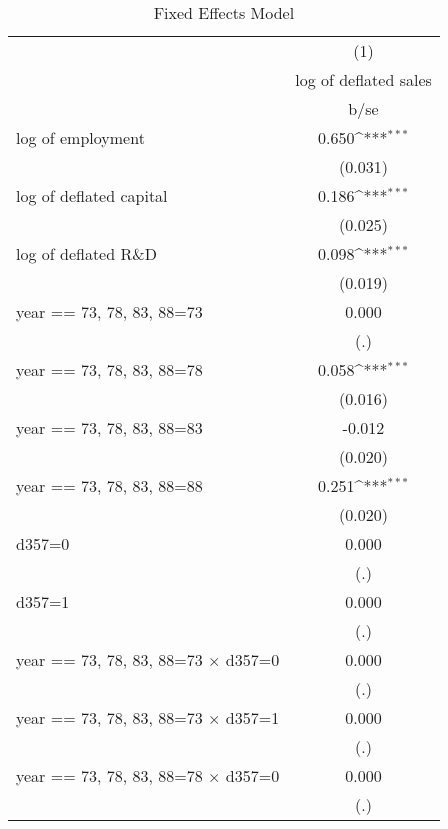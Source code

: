 \begin{table}[htbp]\centering
\def\sym#1{\ifmmode^{#1}\else\(^{#1}\)\fi}
\caption{Fixed Effects Model}
\begin{tabular}{l*{1}{c}}
\toprule
                    &\multicolumn{1}{c}{(1)}\\
                    &\multicolumn{1}{c}{log of deflated sales}\\
                    &        b/se         \\
\midrule
log of employment   &       0.650\sym{***}\\
                    &     (0.031)         \\
log of deflated capital&       0.186\sym{***}\\
                    &     (0.025)         \\
log of deflated R\&D &       0.098\sym{***}\\
                    &     (0.019)         \\
year == 73, 78, 83, 88=73&       0.000         \\
                    &         (.)         \\
year == 73, 78, 83, 88=78&       0.058\sym{***}\\
                    &     (0.016)         \\
year == 73, 78, 83, 88=83&      -0.012         \\
                    &     (0.020)         \\
year == 73, 78, 83, 88=88&       0.251\sym{***}\\
                    &     (0.020)         \\
d357=0              &       0.000         \\
                    &         (.)         \\
d357=1              &       0.000         \\
                    &         (.)         \\
year == 73, 78, 83, 88=73 $\times$ d357=0&       0.000         \\
                    &         (.)         \\
year == 73, 78, 83, 88=73 $\times$ d357=1&       0.000         \\
                    &         (.)         \\
year == 73, 78, 83, 88=78 $\times$ d357=0&       0.000         \\
                    &         (.)         \\

\end{tabular}
\end{table}
